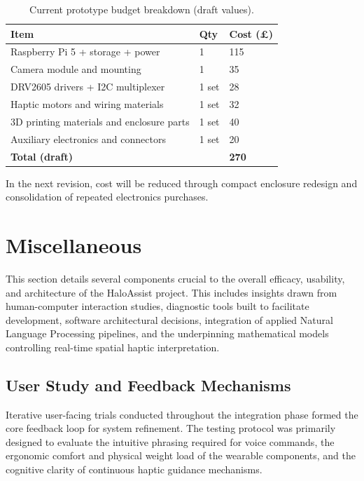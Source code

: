 \documentclass{article}
\begin{document}
\begin{table}[h]
\centering
\small
\setlength{\tabcolsep}{3pt}
\renewcommand{\arraystretch}{1.2}
\begin{tabular}{p{}p{}p{}}
\hline
\textbf{Item} & \textbf{Qty} & \textbf{Cost (\pounds)} \\
\hline
Raspberry Pi 5 + storage + power & 1 & 115 \\
Camera module and mounting & 1 & 35 \\
DRV2605 drivers + I2C multiplexer & 1 set & 28 \\
Haptic motors and wiring materials & 1 set & 32 \\
3D printing materials and enclosure parts & 1 set & 40 \\
Auxiliary electronics and connectors & 1 set & 20 \\
\hline
\textbf{Total (draft)} &  & \textbf{270} \\
\hline
\end{tabular}
\caption{Current prototype budget breakdown (draft values).}
\label{tab:budget-current}
\end{table}

In the next revision, cost will be reduced through compact enclosure redesign and consolidation of repeated electronics purchases.

\section{Miscellaneous}
\label{sec:misc}

This section details several components crucial to the overall efficacy, usability, and architecture of the HaloAssist project. This includes insights drawn from human-computer interaction studies, diagnostic tools built to facilitate development, software architectural decisions, integration of applied Natural Language Processing pipelines, and the underpinning mathematical models controlling real-time spatial haptic interpretation.

\subsection{User Study and Feedback Mechanisms}

Iterative user-facing trials conducted throughout the integration phase formed the core feedback loop for system refinement. The testing protocol was primarily designed to evaluate the intuitive phrasing required for voice commands, the ergonomic comfort and physical weight load of the wearable components, and the cognitive clarity of continuous haptic guidance mechanisms.
\end{document}
